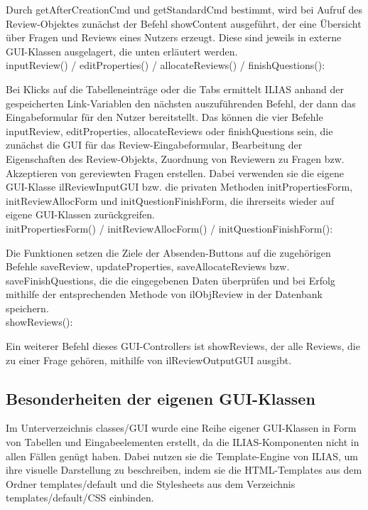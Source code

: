 \documentclass[a4paper]{scrreprt}
\begin{document}
Durch getAfterCreationCmd und getStandardCmd bestimmt, wird bei Aufruf des Review-Objektes zunächst der Befehl showContent ausgeführt, der eine Übersicht über Fragen und Reviews eines Nutzers erzeugt. 
Diese sind jeweils in externe GUI-Klassen ausgelagert, die unten erläutert werden.\\

inputReview() / editProperties() / allocateReviews() / finishQuestions():

Bei Klicks auf die Tabelleneinträge oder die Tabs ermittelt ILIAS anhand der gespeicherten Link-Variablen den nächsten auszuführenden Befehl, der dann das Eingabeformular für den Nutzer bereitstellt. 
Das können die vier Befehle inputReview, editProperties, allocateReviews oder finishQuestions sein, die zunächst die GUI für das Review-Eingabeformular, Bearbeitung der Eigenschaften des Review-Objekts, Zuordnung von Reviewern zu Fragen bzw. Akzeptieren von gereviewten Fragen erstellen. 
Dabei verwenden sie die eigene GUI-Klasse ilReviewInputGUI bzw. die privaten Methoden initPropertiesForm, initReviewAllocForm und initQuestionFinishForm, die ihrerseits wieder auf eigene GUI-Klassen zurückgreifen. \\

initPropertiesForm() / initReviewAllocForm() / initQuestionFinishForm():

Die Funktionen setzen die Ziele der Absenden-Buttons auf die zugehörigen Befehle saveReview, updateProperties, saveAllocateReviews bzw. saveFinishQuestions, die die eingegebenen Daten überprüfen und bei Erfolg mithilfe der entsprechenden Methode von ilObjReview in der Datenbank speichern.\\

showReviews():

Ein weiterer Befehl dieses GUI-Controllers ist showReviews, der alle Reviews, die zu einer Frage gehören, mithilfe von ilReviewOutputGUI ausgibt.\\

\subsection{Besonderheiten der eigenen GUI-Klassen}

Im Unterverzeichnis classes/GUI wurde eine Reihe eigener GUI-Klassen in Form von Tabellen und Eingabeelementen erstellt, da die ILIAS-Komponenten nicht in allen Fällen genügt haben. 
Dabei nutzen sie die Template-Engine von ILIAS, um ihre visuelle Darstellung zu beschreiben, indem sie die HTML-Templates aus dem Ordner templates/default und die Stylesheets aus dem Verzeichnis templates/default/CSS einbinden.
\end{document}
